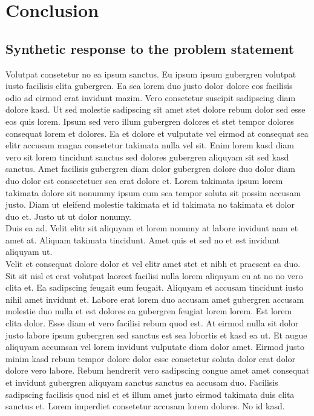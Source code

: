 \documentclass[a4paper,11pt]{article}
\begin{document}
\section{Conclusion}
\subsection{Synthetic response to the problem statement}
%
Volutpat consetetur no ea ipsum sanctus. Eu ipsum ipsum gubergren volutpat iusto facilisis clita gubergren. Ea sea lorem duo justo dolor dolore eos facilisis odio ad eirmod erat invidunt mazim. Vero consetetur suscipit sadipscing diam dolore kasd. Ut sed molestie sadipscing sit amet stet dolore rebum dolor sed esse eos quis lorem. Ipsum sed vero illum gubergren dolores et stet tempor dolores consequat lorem et dolores. Ea et dolore et vulputate vel eirmod at consequat sea elitr accusam magna consetetur takimata nulla vel sit. Enim lorem kasd diam vero sit lorem tincidunt sanctus sed dolores gubergren aliquyam sit sed kasd sanctus. Amet facilisis gubergren diam dolor gubergren dolore duo dolor diam duo dolor est consectetuer sea erat dolore et. Lorem takimata ipsum lorem takimata dolore sit nonummy ipsum eum sea tempor soluta sit possim accusam justo. Diam ut eleifend molestie takimata et id takimata no takimata et dolor duo et. Justo ut ut dolor nonumy. \\
%
\noindent
Duis ea ad. Velit elitr sit aliquyam et lorem nonumy at labore invidunt nam et amet at. Aliquam takimata tincidunt. Amet quis et sed no et est invidunt aliquyam ut. \\
%
\noindent
Velit et consequat dolore dolor et vel elitr amet stet et nibh et praesent ea duo. Sit sit nisl et erat volutpat laoreet facilisi nulla lorem aliquyam eu at no no vero clita et. Ea sadipscing feugait eum feugait. Aliquyam et accusam tincidunt iusto nihil amet invidunt et. Labore erat lorem duo accusam amet gubergren accusam molestie duo nulla et est dolores ea gubergren feugiat lorem lorem. Est lorem clita dolor. Esse diam et vero facilisi rebum quod est. At eirmod nulla sit dolor justo labore ipsum gubergren sed sanctus est sea lobortis et kasd ea ut. Et augue aliquyam accumsan vel lorem invidunt vulputate diam dolor amet. Eirmod justo minim kasd rebum tempor dolore dolor esse consetetur soluta dolor erat dolor dolore vero labore. Rebum hendrerit vero sadipscing congue amet amet consequat et invidunt gubergren aliquyam sanctus sanctus ea accusam duo. Facilisis sadipscing facilisis quod nisl et et illum amet justo eirmod takimata duis clita sanctus et. Lorem imperdiet consetetur accusam lorem dolores. No id kasd. \\
%
\newpage
%
\end{document}
